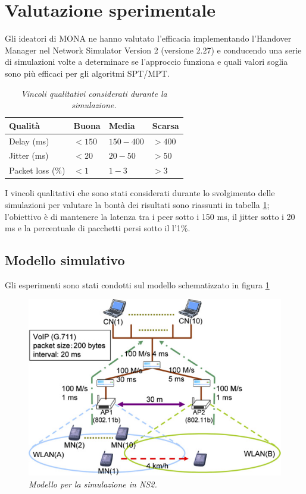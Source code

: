 \documentclass[12pt,a4paper,openright,twoside,draft]{book}
\begin{document}
\section{Valutazione sperimentale}

Gli ideatori di MONA ne hanno valutato l'efficacia implementando
l'Handover Manager nel Network Simulator Version 2 \cite{bib:ns-2}
(versione 2.27) e conducendo una serie di simulazioni volte a
determinare se l'approccio funziona e quali valori soglia sono più
efficaci per gli algoritmi SPT/MPT.

\begin{table}
  \centering
  \begin{tabular}[bt]{|llll|}
    \hline
    Qualità & Buona & Media & Scarsa         \\
    \hline
    Delay (ms) & $<150$ & $150-400$ & $>400$ \\
    Jitter (ms) & $<20$ & $20-50$ & $>50$    \\
    Packet loss (\%) & $<1$ & $1-3$ & $>3$   \\
    \hline
  \end{tabular}
  \caption{\em Vincoli qualitativi considerati durante la simulazione.}
  \label{tab:mona:vincoli}
\end{table}

I vincoli qualitativi che sono stati considerati durante lo
svolgimento delle simulazioni per valutare la bontà dei risultati sono
riassunti in tabella \ref{tab:mona:vincoli}; l'obiettivo è di
mantenere la latenza tra i peer sotto i 150 ms, il jitter sotto i 20
ms e la percentuale di pacchetti persi sotto il l'1\%.

\subsection{Modello simulativo}

Gli esperimenti sono stati condotti sul modello schematizzato in
figura \ref{fig:mona:qos-sim-model}

\begin{figure}
  \centering
  \includegraphics[width=12cm]{img/mona-qos-sim-model}
  \caption{\em Modello per la simulazione in NS2.}
  \label{fig:mona:qos-sim-model}
\end{figure}
\end{document}

